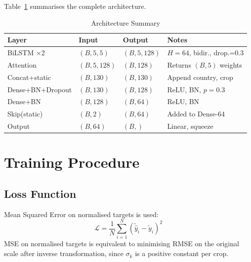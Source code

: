 \documentclass[conference]{IEEEtran}
\begin{document}
Table~\ref{tab:arch} summarises the complete architecture.

\begin{table}[H]
\caption{Architecture Summary}
\label{tab:arch}
\centering
\begin{tabular}{llll}
\toprule
\textbf{Layer} & \textbf{Input} & \textbf{Output} & \textbf{Notes} \\
\midrule
BiLSTM $\times$2  & $(B,5,5)$   & $(B,5,128)$ & $H{=}64$, bidir., drop.=0.3 \\
Attention         & $(B,5,128)$ & $(B,128)$   & Returns $(B,5)$ weights \\
Concat+static     & $(B,130)$   & $(B,130)$   & Append country, crop \\
Dense+BN+Dropout  & $(B,130)$   & $(B,128)$   & ReLU, BN, $p{=}0.3$ \\
Dense+BN          & $(B,128)$   & $(B,64)$    & ReLU, BN \\
Skip(static)      & $(B,2)$     & $(B,64)$    & Added to Dense-64 \\
Output            & $(B,64)$    & $(B,)$      & Linear, squeeze \\
\bottomrule
\end{tabular}
\end{table}

\section{Training Procedure}
\label{sec:training}

\subsection{Loss Function}
Mean Squared Error on normalised targets is used:
\begin{equation}
    \mathcal{L} = \frac{1}{N}\sum_{i=1}^{N}(\tilde{\hat{y}}_i - \tilde{y}_i)^2
\end{equation}
MSE on normalised targets is equivalent to minimising RMSE on the original scale
after inverse transformation, since $\sigma_k$ is a positive constant per crop.
\end{document}
